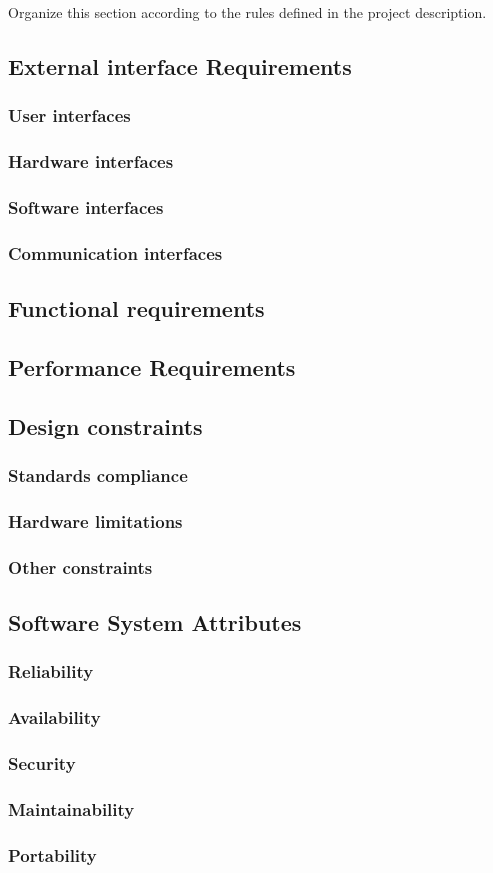 Organize this section according to the rules defined in the project description. 


\subsection{External interface Requirements}
\subsubsection{User interfaces}
\subsubsection{Hardware interfaces}
\subsubsection{Software interfaces}
\subsubsection{Communication interfaces}

\subsection{Functional requirements}

\subsection{Performance Requirements}

\subsection{Design constraints}
\subsubsection{Standards compliance}
\subsubsection{Hardware limitations}
\subsubsection{Other constraints}

\subsection{Software System Attributes}
\subsubsection{Reliability}
\subsubsection{Availability}
\subsubsection{Security}
\subsubsection{Maintainability}
\subsubsection{Portability}